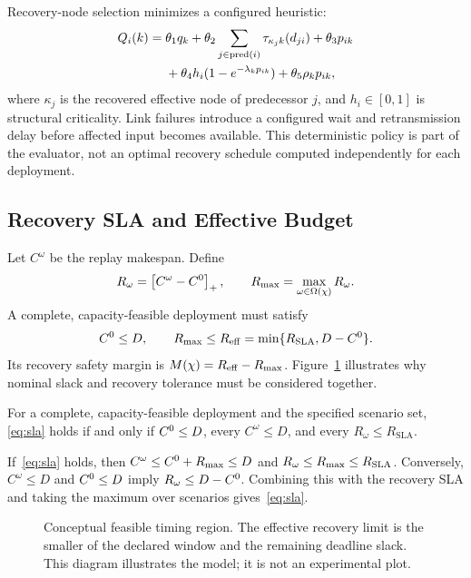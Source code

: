 Recovery-node selection minimizes a configured heuristic:
\begin{equation}
\begin{split}
 Q_i(k)={}&\theta_1q_k+
 \theta_2\sum_{j\in\operatorname{pred}(i)}\tau_{\kappa_j k}(d_{ji})
 +\theta_3p_{ik}\\
 &+\theta_4h_i(1-e^{-\lambda_kp_{ik}})
 +\theta_5\rho_kp_{ik},
\end{split}
\label{eq:recovery_selection}
\end{equation}
where $\kappa_j$ is the recovered effective node of predecessor $j$, and
$h_i\in[0,1]$ is structural criticality. Link failures introduce a configured
wait and retransmission delay before affected input becomes available.
This deterministic policy is part of the evaluator, not an optimal recovery
schedule computed independently for each deployment.

\subsection{Recovery SLA and Effective Budget}
Let $C^{\omega}$ be the replay makespan. Define
\begin{equation}
 R_{\omega}=\left[C^{\omega}-C^{0}\right]_{+},\qquad
 R_{\max}=\max_{\omega\in\Omega(\chi)}R_{\omega}.
 \label{eq:recovery_delay}
\end{equation}
A complete, capacity-feasible deployment must satisfy
\begin{equation}
 C^{0}\leq D,\qquad
 R_{\max}\leq R_{\mathrm{eff}}=\min\{R_{\mathrm{SLA}},D-C^{0}\}.
 \label{eq:sla}
\end{equation}
Its recovery safety margin is $M(\chi)=R_{\mathrm{eff}}-R_{\max}$.
Figure~\ref{fig:budget} illustrates why nominal slack and recovery tolerance
must be considered together.

\begin{proposition}
For a complete, capacity-feasible deployment and the specified scenario set,
\eqref{eq:sla} holds if and only if $C^{0}\leq D$, every
$C^{\omega}\leq D$, and every $R_{\omega}\leq R_{\mathrm{SLA}}$.
\end{proposition}
\begin{IEEEproof}
If~\eqref{eq:sla} holds, then
$C^{\omega}\leq C^{0}+R_{\max}\leq D$ and
$R_{\omega}\leq R_{\max}\leq R_{\mathrm{SLA}}$.
Conversely, $C^{\omega}\leq D$ and $C^{0}\leq D$ imply
$R_{\omega}\leq D-C^{0}$. Combining this with the recovery SLA and taking
the maximum over scenarios gives~\eqref{eq:sla}.
\end{IEEEproof}

\begin{figure}[!t]
 \centering
 
 \caption{Conceptual feasible timing region. The effective recovery limit is
 the smaller of the declared window and the remaining deadline slack. This
 diagram illustrates the model; it is not an experimental plot.}
 \label{fig:budget}
\end{figure}

